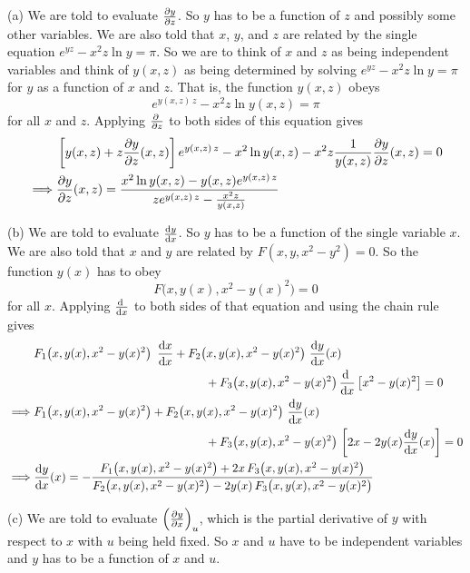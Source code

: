 \begin{solution}
(a)
We are told to evaluate $\pdiff{y}{z}$. So $y$ has to be a function of $z$
and possibly some other variables.
We are also told that $x$, $y$, and $z$ are related by the single equation
$e^{yz}-x^2 z \ln y = \pi$.
So we are to think of $x$ and $z$ as being independent variables and think of 
$y(x,z)$ as being determined by solving $e^{yz}-x^2 z \ln y = \pi$ for $y$ as a function of $x$ and $z$. That is, the function $y(x,z)$ obeys
\begin{equation*}
e^{y(x,z)\,z}-x^2 z \ln y(x,z) = \pi
\end{equation*}
for all $x$ and $z$.
Applying 
$\pdiff{}{z}$ to both sides of this equation gives
\begin{align*}
&\left[y(x,z)+z\pdiff{y}{z}(x,z)\right]e^{y(x,z)\,z}-x^2 \ln y(x,z)
-x^2 z\frac{1}{y(x,z)}\pdiff{y}{z}(x,z) = 0\\
\implies & \pdiff{y}{z}(x,z)
=\frac{x^2 \ln y(x,z)-y(x,z)e^{y(x,z)\,z}}{ze^{y(x,z)\,z}-\frac{x^2 z}{y(x,z)}}
\end{align*}

(b) 
We are told to evaluate $\diff{y}{x}$. So $y$ has to be a function of the single variable $x$. We are also told that $x$ and $y$ are related by $F(x,y,x^2-y^2)=0$. So the function $y(x)$ has to obey 
\begin{equation*}
F\big(x,y(x),x^2-y(x)^2\big)=0
\end{equation*}
for all $x$. Applying 
$\diff{}{x}$ to both sides of that equation and using the chain rule gives
\begin{align*}
&F_1\big(x,y(x),x^2-y(x)^2\big)\,\ \diff{x}{x} 
+F_2\big(x,y(x),x^2-y(x)^2\big)\ \diff{y}{x}(x)
\\&\hskip2in
+F_3\big(x,y(x),x^2-y(x)^2\big)\,\diff{}{x}\left[x^2-y(x)^2\right]= 0
\\
\implies &F_1\big(x,y(x),x^2-y(x)^2\big) +F_2\big(x,y(x),x^2-y(x)^2\big)\ \diff{y}{x}(x)
\\&\hskip2in
+F_3\big(x,y(x),x^2-y(x)^2\big)\,\left[2x-2y(x)\diff{y}{x}(x)\right]= 0
\\
\implies & \diff{y}{x}(x)
=-\frac{F_1\big(x,y(x),x^2-y(x)^2\big)+2x\,F_3\big(x,y(x),x^2-y(x)^2\big)}
{F_2\big(x,y(x),x^2-y(x)^2\big)-2y(x)\,F_3\big(x,y(x),x^2-y(x)^2\big)}
\end{align*}

(c) 
We are told to evaluate $\left(\pdiff{y}{x}\right)_u$, which is the partial
derivative of $y$ with respect to $x$ with $u$ being held fixed.
So $x$ and $u$ have to be independent variables and $y$ has to be a function of
$x$ and $u$.


\end{solution}

